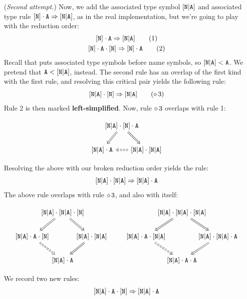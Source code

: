 \documentclass[../generics]{subfiles}
\begin{document}
\begin{example}
\smallskip

(\emph{Second attempt.})
Now, we add the associated type symbol $[\texttt{N}|\texttt{A}]$ and associated type rule $[\texttt{N}] \cdot \texttt{A} \Rightarrow [\texttt{N}|\texttt{A}]$, as in the real implementation, but we're going to play with the reduction order:
\begin{gather*}
\AssocIntro{N}{A}\tag{1}\\
\ProtoConf{\pN\cdot\nA}{N}\tag{2}
\end{gather*}
Recall that  puts associated type symbols before name symbols, so $[\texttt{N}|\texttt{A}] < \texttt{A}$. We pretend that $\texttt{A} < [\texttt{N}|\texttt{A}]$, instead. The second rule has an overlap of the first kind with the first rule, and resolving this critical pair yields the following rule:
\[
\ProtoConf{\aNA}{N}\tag{$\CRule{3}$}
\]
Rule 2 is then marked \textbf{left-simplified}. Now, rule $\diamond\, 3$ overlaps with rule 1:
\begin{ceqn}
\[
\begin{tikzcd}[column sep=-2em]
&\aNA\cdot\pN\cdot\nA\arrow[ld, Rightarrow]\arrow[rd, Rightarrow]\\
\aNA\cdot\nA && \aNA\cdot\aNA\arrow[ll, Rightarrow, dashed]
\end{tikzcd}
\]
\end{ceqn}
Resolving the above with our broken reduction order yields the rule:
\[
[\texttt{N}|\texttt{A}] \cdot [\texttt{N}|\texttt{A}] \Rightarrow [\texttt{N}|\texttt{A}] \cdot \texttt{A}
\]
The above rule overlaps with rule $\diamond\, 3$, and also with itself:
\begin{ceqn}
\[
\begin{tikzcd}[column sep=-2em]
&\aNA\cdot\aNA\cdot\pN\arrow[ld, Rightarrow]\arrow[rd, Rightarrow]\\
\aNA\cdot\nA\cdot\pN\arrow[rd, Rightarrow, dashed] && \aNA\cdot\aNA\arrow[ld, Rightarrow]\\
&\aNA\cdot\nA
\end{tikzcd}
\qquad
\begin{tikzcd}[column sep=-2em]
&\aNA\cdot\aNA\cdot\aNA\arrow[ld, Rightarrow]\arrow[rd, Rightarrow]\\
\aNA\cdot\nA\cdot\aNA\arrow[rd, Rightarrow, dashed] && \aNA\cdot\aNA\cdot\nA\arrow[ld, Rightarrow]\\
&\aNA\cdot\nA\cdot\nA
\end{tikzcd}
\]
\end{ceqn}
We record two new rules:
\begin{gather*}
\aNA\cdot\nA\cdot\pN \Red \aNA\cdot\nA \\

\end{gather*}
\end{example}
\end{document}
